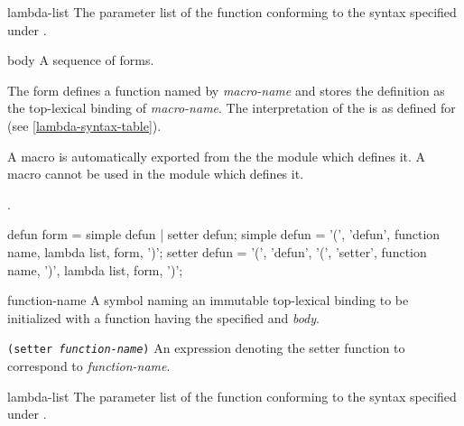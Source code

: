 \begin{optDefinition}
\begin{arguments}
    \item[lambda-list] The parameter list of the function conforming to the
    syntax specified under .

    \item[body] A sequence of forms.
\end{arguments}
%
\remarks%
The  form defines a function named by
{\em macro-name} and stores the definition as the top-lexical binding of {\em
    macro-name}.  The interpretation
of the  is as defined for  (see
\ref{lambda-syntax-table}).
%
\begin{note}
    A macro is automatically exported from the the module which defines it.  A
    macro cannot be used in the module which defines it.
\end{note}
%
\seealso%
.

%
\Syntax
\savesyntax{}\vbox{\syntax
defun form
   = simple defun
   | setter defun;
simple defun
   = '(', 'defun', function name, lambda list,
     {form}, ')';
setter defun
   = '(', 'defun',
          '(', 'setter', function name, ')',
          lambda list, {form}, ')';
\endsyntax}
%
\begin{arguments}
    \item[function-name] A symbol naming an immutable top-lexical binding to be
    initialized with a function having the specified  and {\em
        body}.

    \item[{\tt (setter {\em function-name})}] An expression denoting the setter
    function to correspond to {\em function-name}.

    \item[lambda-list] The parameter list of the function conforming to the
    syntax specified under .


\end{arguments}
\end{optDefinition}
